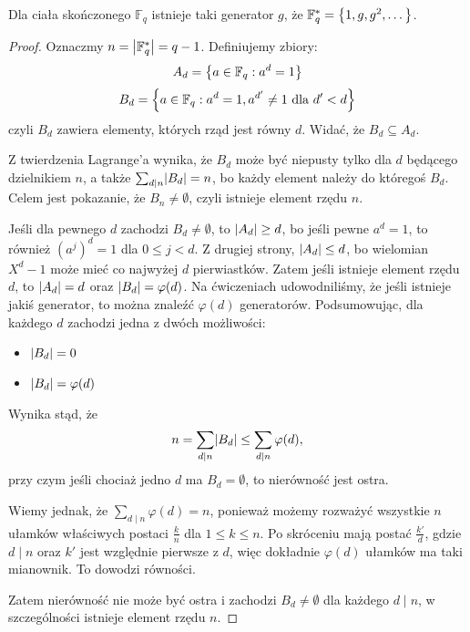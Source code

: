 \begin{theorem}
Dla ciała skończonego \( \mathbb{F}_q \) istnieje taki generator \( g \), że \( \mathbb{F}^{*}_q = \set{1, g, g^2, \text{\dots}} \).
\end{theorem}
\begin{proof}
    Oznaczmy \( n = \left\lvert\mathbb{F}^{*}_q\right\rvert = q-1 \). Definiujemy zbiory:
    \[
        A_d = \set{a \in \mathbb{F}_q : a^d = 1}
    \]
    \[
        B_d = \set{a \in \mathbb{F}_q : a^d = 1, a^{d'} \neq 1 \text{ dla } d' < d}
    \]
    czyli \( B_d \) zawiera elementy, których rząd jest równy \( d \). Widać, że \( B_d \subseteq A_d \).

    Z twierdzenia Lagrange'a wynika, że \( B_d \) może być niepusty tylko dla \( d \) będącego dzielnikiem \( n \), a także \( \sum_{d \mid n} \abs{B_d} = n \), bo każdy element należy do któregoś \( B_d \). Celem jest pokazanie, że \( B_n \neq \emptyset \), czyli istnieje element rzędu \( n \).

    Jeśli dla pewnego \( d \) zachodzi \( B_d \neq \emptyset \), to \( \left\lvert A_d\right\rvert \geq d \), bo jeśli pewne \( a^d = 1 \), to również \( (a^j)^d = 1 \) dla \( 0 \leq j < d \). Z drugiej strony, \( \left\lvert A_d\right\rvert \leq d \), bo wielomian \( X^d-1 \) może mieć co najwyżej \( d \) pierwiastków. Zatem jeśli istnieje element rzędu \( d \), to \( \left\lvert A_d\right\rvert = d \) oraz \( \left\lvert B_d\right\rvert = \varphi(d) \).
    Na ćwiczeniach udowodniliśmy, że jeśli istnieje jakiś generator, to można znaleźć \( \varphi(d) \) generatorów.
    Podsumowując, dla każdego \( d \) zachodzi jedna z dwóch możliwości:
    \begin{itemize}
        \item \( \left\lvert B_d\right\rvert = 0 \)
        \item \( \left\lvert B_d\right\rvert = \varphi(d) \)
    \end{itemize}
    Wynika stąd, że
    \[
        n = \sum_{d \mid n} \abs{B_d} \leq \sum_{d \mid n} \varphi(d), 
    \]
    przy czym jeśli chociaż jedno \( d \) ma \( B_d = \emptyset \), to nierówność jest ostra.
    
    Wiemy jednak, że \( \sum_{d \mid n} \varphi(d) = n \), ponieważ możemy rozważyć wszystkie \( n \) ułamków właściwych postaci \( \frac{k}{n} \) dla \( 1 \leq k \leq n \).
    Po skróceniu mają postać \( \frac{k'}{d} \), gdzie \( d \mid n \) oraz \( k' \) jest względnie pierwsze z \( d \), więc dokładnie \( \varphi(d) \) ułamków ma taki mianownik. To dowodzi równości.

    Zatem nierówność nie może być ostra i zachodzi \( B_d \neq \emptyset \) dla każdego \( d \mid n \), w szczególności istnieje element rzędu \( n \).
\end{proof}